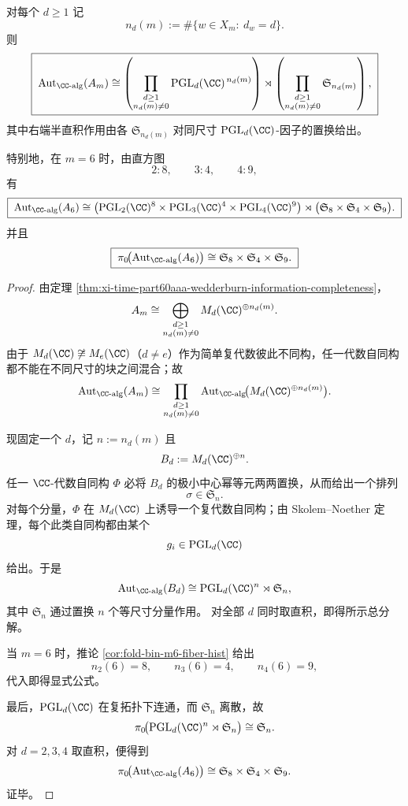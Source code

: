 \begin{theorem}[纤维群胚代数自同构群的半直积分解]\label{thm:xi-time-part60acb-binfold-algebra-automorphism-semidirect}
对每个 \(d\ge 1\) 记
\[
n_d(m):=\#\{w\in X_m:\ d_w=d\}.
\]
则
\[
\boxed{\;
\operatorname{Aut}_{\CC\text{-alg}}(A_m)
\cong
\left(\prod_{\substack{d\ge 1\\ n_d(m)\neq 0}}\operatorname{PGL}_d(\CC)^{\,n_d(m)}\right)
\rtimes
\left(\prod_{\substack{d\ge 1\\ n_d(m)\neq 0}}\mathfrak S_{n_d(m)}\right),\;}
\]
其中右端半直积作用由各 \(\mathfrak S_{n_d(m)}\) 对同尺寸 \(\operatorname{PGL}_d(\CC)\)-因子的置换给出。

特别地，在 \(m=6\) 时，由直方图
\[
2:8,\qquad 3:4,\qquad 4:9,
\]
有
\[
\boxed{\;
\operatorname{Aut}_{\CC\text{-alg}}(A_6)
\cong
\bigl(\operatorname{PGL}_2(\CC)^8\times \operatorname{PGL}_3(\CC)^4\times \operatorname{PGL}_4(\CC)^9\bigr)
\rtimes
\bigl(\mathfrak S_8\times \mathfrak S_4\times \mathfrak S_9\bigr).\;}
\]
并且
\[
\boxed{\;
\pi_0\!\bigl(\operatorname{Aut}_{\CC\text{-alg}}(A_6)\bigr)
\cong
\mathfrak S_8\times \mathfrak S_4\times \mathfrak S_9.\;}
\]
\end{theorem}
\begin{proof}
由定理 \ref{thm:xi-time-part60aaa-wedderburn-information-completeness}，
\[
A_m
\cong
\bigoplus_{\substack{d\ge 1\\ n_d(m)\neq 0}}M_d(\CC)^{\oplus n_d(m)}.
\]
由于 \(M_d(\CC)\not\cong M_e(\CC)\)（\(d\neq e\)）作为简单复代数彼此不同构，任一代数自同构都不能在不同尺寸的块之间混合；故
\[
\operatorname{Aut}_{\CC\text{-alg}}(A_m)
\cong
\prod_{\substack{d\ge 1\\ n_d(m)\neq 0}}
\operatorname{Aut}_{\CC\text{-alg}}\!\bigl(M_d(\CC)^{\oplus n_d(m)}\bigr).
\]

现固定一个 \(d\)，记 \(n:=n_d(m)\) 且
\[
B_d:=M_d(\CC)^{\oplus n}.
\]
任一 \(\CC\)-代数自同构 \(\Phi\) 必将 \(B_d\) 的极小中心幂等元两两置换，从而给出一个排列
\[
\sigma\in \mathfrak S_n.
\]
对每个分量，\(\Phi\) 在 \(M_d(\CC)\) 上诱导一个复代数自同构；由 Skolem--Noether 定理，每个此类自同构都由某个
\[
g_i\in \operatorname{PGL}_d(\CC)
\]
给出。于是
\[
\operatorname{Aut}_{\CC\text{-alg}}(B_d)
\cong
\operatorname{PGL}_d(\CC)^n\rtimes \mathfrak S_n,
\]
其中 \(\mathfrak S_n\) 通过置换 \(n\) 个等尺寸分量作用。
对全部 \(d\) 同时取直积，即得所示总分解。

当 \(m=6\) 时，推论 \ref{cor:fold-bin-m6-fiber-hist} 给出
\[
n_2(6)=8,\qquad n_3(6)=4,\qquad n_4(6)=9,
\]
代入即得显式公式。

最后，\(\operatorname{PGL}_d(\CC)\) 在复拓扑下连通，而 \(\mathfrak S_n\) 离散，故
\[
\pi_0\!\bigl(\operatorname{PGL}_d(\CC)^n\rtimes \mathfrak S_n\bigr)\cong \mathfrak S_n.
\]
对 \(d=2,3,4\) 取直积，便得到
\[
\pi_0\!\bigl(\operatorname{Aut}_{\CC\text{-alg}}(A_6)\bigr)
\cong
\mathfrak S_8\times \mathfrak S_4\times \mathfrak S_9.
\]
证毕。
\end{proof}


